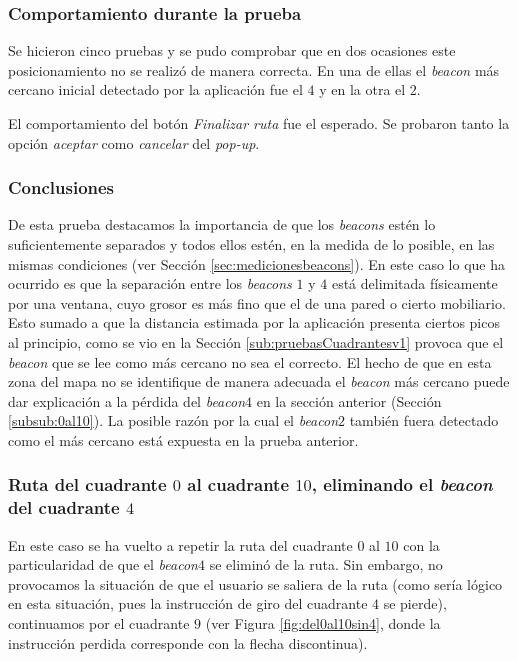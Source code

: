 \subsubsection*{Comportamiento durante la prueba}

Se hicieron cinco pruebas y se pudo comprobar que en dos ocasiones este posicionamiento no se realizó de manera correcta. En una de ellas el \textit{beacon} más cercano inicial detectado por la aplicación fue el $4$ y en la otra el $2$.

El comportamiento del botón \textit{Finalizar ruta} fue el esperado. Se probaron tanto la opción \textit{aceptar} como \textit{cancelar} del \textit{pop-up}.


\subsubsection*{Conclusiones}

De esta prueba destacamos la importancia de que los \textit{beacons} estén lo suficientemente separados y todos ellos estén, en la medida de lo posible, en las mismas condiciones (ver Sección \ref{sec:medicionesbeacons}). En este caso lo que ha ocurrido es que la separación entre los \textit{beacons} $1$ y $4$ está delimitada físicamente por una ventana, cuyo grosor es más fino que el de una pared o cierto mobiliario. Esto sumado a que la distancia estimada por la aplicación presenta ciertos picos al principio, como se vio en la Sección \ref{sub:pruebasCuadrantesv1} provoca que el \textit{beacon} que se lee como más cercano no sea el correcto. El hecho de que en esta zona del mapa no se identifique de manera adecuada el \textit{beacon} más cercano puede dar explicación a la pérdida del \textit{beacon$4$} en la sección anterior (Sección \ref{subsub:0al10}). La posible razón por la cual el \textit{beacon$2$} también fuera detectado como el más cercano está expuesta en la prueba anterior.


\subsubsection{Ruta del cuadrante $0$ al cuadrante $10$, eliminando el \textit{beacon} del cuadrante $4$}
\label{subsub:0al10sin4}

En este caso se ha vuelto a repetir la ruta del cuadrante $0$ al $10$ con la particularidad de que el \textit{beacon$4$} se eliminó de la ruta. Sin embargo, no provocamos la situación de que el usuario se saliera de la ruta (como sería lógico en esta situación, pues la instrucción de giro del cuadrante $4$ se pierde), continuamos por el cuadrante $9$ (ver Figura \ref{fig:del0al10sin4}, donde la instrucción perdida corresponde con la flecha discontinua). 

